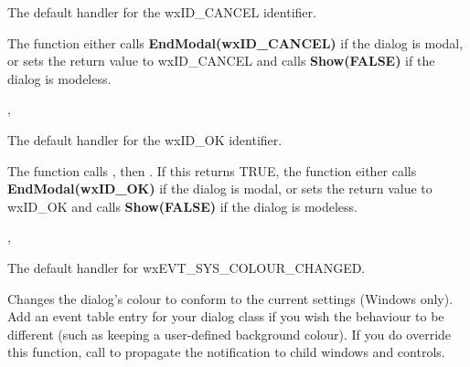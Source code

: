 
The default handler for the wxID\_CANCEL identifier.


The function either calls {\bf EndModal(wxID\_CANCEL)} if the dialog is modal, or
sets the return value to wxID\_CANCEL and calls {\bf Show(FALSE)} if the dialog is modeless.


, 

\label{wxdialogonok}


The default handler for the wxID\_OK identifier.


The function calls
\rtfsp{}, then .
If this returns TRUE, the function either calls {\bf EndModal(wxID\_OK)} if the dialog is modal, or
sets the return value to wxID\_OK and calls {\bf Show(FALSE)} if the dialog is modeless.


, 

\label{wxdialogonsyscolourchanged}


The default handler for wxEVT\_SYS\_COLOUR\_CHANGED.




Changes the dialog's colour to conform to the current settings (Windows only).
Add an event table entry for your dialog class if you wish the behaviour
to be different (such as keeping a user-defined
background colour). If you do override this function, call  to
propagate the notification to child windows and controls.


